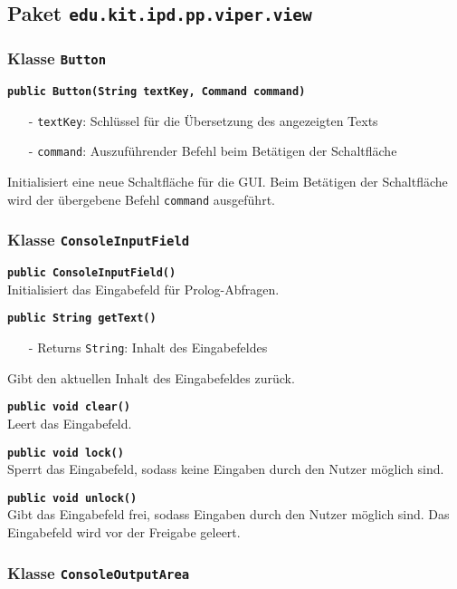 \documentclass[parskip=full,11pt,twoside]{scrartcl}
\begin{document}
\subsection{Paket \texttt{edu.kit.ipd.pp.viper.view}}

\subsubsection{Klasse \texttt{Button}}

\textbf{\texttt{public Button(String textKey, Command command)}}
\begin{itemize}[noitemsep]
	\item[-] \texttt{textKey}: Schlüssel für die Übersetzung des angezeigten Texts
	\item[-] \texttt{command}: Auszuführender Befehl beim Betätigen der Schaltfläche
\end{itemize}
Initialisiert eine neue Schaltfläche für die GUI. Beim Betätigen der Schaltfläche wird der übergebene Befehl \texttt{command} ausgeführt.

\subsubsection{Klasse \texttt{ConsoleInputField}}

\textbf{\texttt{public ConsoleInputField()}}\\
Initialisiert das Eingabefeld für Prolog-Abfragen.

\textbf{\texttt{public String getText()}}
\begin{itemize}[noitemsep]
	\item[-] Returns \texttt{String}: Inhalt des Eingabefeldes
\end{itemize}
Gibt den aktuellen Inhalt des Eingabefeldes zurück.

\textbf{\texttt{public void clear()}}\\
Leert das Eingabefeld.

\textbf{\texttt{public void lock()}}\\
Sperrt das Eingabefeld, sodass keine Eingaben durch den Nutzer möglich sind.

\textbf{\texttt{public void unlock()}}\\
Gibt das Eingabefeld frei, sodass Eingaben durch den Nutzer möglich sind. Das Eingabefeld wird vor der Freigabe geleert.

\subsubsection{Klasse \texttt{ConsoleOutputArea}}
\end{document}
